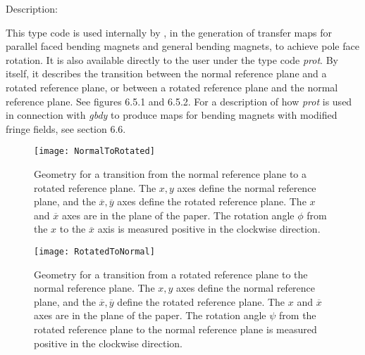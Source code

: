 \vspace{5mm}
     Description:
\vspace{2mm}

    This type code is used internally by \Maryend, in the generation of
transfer maps for parallel faced bending magnets and general bending
magnets, to achieve pole face rotation.  It is also available directly to
the user under the type code {\em prot}.  By itself, it describes the transition
between the normal reference plane and a rotated reference plane, or
between a rotated reference plane and the normal reference plane.  See
figures 6.5.1 and 6.5.2.  For a description of how {\em prot} is used in connection with {\em gbdy} to produce maps for bending magnets with modified fringe fields, see section 6.6.


\begin{figure}[p]
  \centering
  \texttt{[image: NormalToRotated]}
  \caption{Geometry for a transition from the normal reference plane to a rotated reference plane.  The $x,y$ axes define the normal reference plane, and the $\overline{x},\overline{y}$ axes define the rotated reference plane.  The $x$ and $\overline{x}$ axes are in the plane of the paper.  The rotation angle $\phi$ from the $x$ to the $\overline{x}$ axis is measured positive in the clockwise direction.}
\end{figure}


\begin{figure}[p]
  \centering
  \texttt{[image: RotatedToNormal]}
  \caption{Geometry for a transition from a rotated reference plane to the normal reference plane.  The $x,y$ axes define the normal reference plane, and the $\overline{x},\overline{y}$ define the rotated reference plane.  The $x$ and $\overline{x}$ axes are in the plane of the paper.  The rotation angle $\psi$ from the rotated reference plane to the normal reference plane is measured positive in the clockwise direction.}
\end{figure}

\newpage
